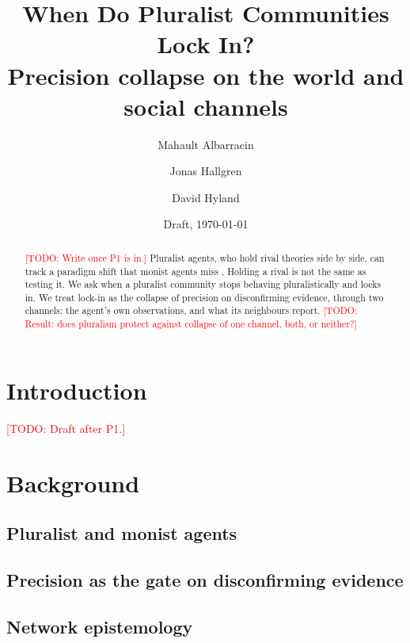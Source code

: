 \documentclass[11pt]{article}
\title{When Do Pluralist Communities Lock In?\\
\large Precision collapse on the world and social channels}
\author{Mahault Albarracin \and Jonas Hallgren \and David Hyland}
\date{Draft, \today}
\newcommand{\todo}[1]{\textcolor{red}{[TODO: #1]}}
\begin{document}
\maketitle

\begin{abstract}
\todo{Write once P1 is in.}
Pluralist agents, who hold rival theories side by side, can track a paradigm shift
that monist agents miss \citep{hallgren2026Pluralist}. Holding a rival is not the same
as testing it. We ask when a pluralist community stops behaving pluralistically and
locks in. We treat lock-in as the collapse of precision on disconfirming evidence,
through two channels: the agent's own observations, and what its neighbours report.
\todo{Result: does pluralism protect against collapse of one channel, both, or neither?}
\end{abstract}

\section{Introduction}
\todo{Draft after P1.}

\section{Background}
\subsection{Pluralist and monist agents}
\subsection{Precision as the gate on disconfirming evidence}
\subsection{Network epistemology}
\end{document}
